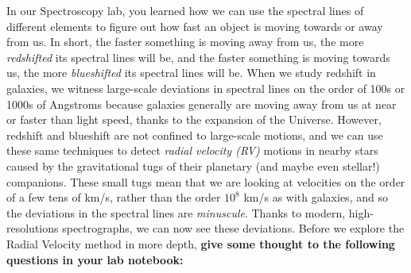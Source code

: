 \documentclass[11pt]{article}
\begin{document}
In our Spectroscopy lab, you learned how we can use the spectral lines of different elements to figure out how fast an object is moving towards or away from us.  In short, the faster something is moving away from us, the more \textit{redshifted} its spectral lines will be, and the faster something is moving towards us, the more \textit{blueshifted} its spectral lines will be.  When we study redshift in galaxies, we witness large-scale deviations in spectral lines on the order of 100s or 1000s of Angstroms because galaxies generally are moving away from us at near or faster than light speed, thanks to the expansion of the Universe.  However, redshift and blueshift are not confined to large-scale motions, and we can use these same techniques to detect \textit{radial velocity (RV)} motions in nearby stars caused by the gravitational tugs of their planetary (and maybe even stellar!) companions.  These small tugs mean that we are looking at velocities on the order of a few tens of km/s, rather than the order $10^8$ km/s as with galaxies, and so the deviations in the spectral lines are \textit{minuscule}.  Thanks to modern, high-resolutions spectrographs, we can now see these deviations.  Before we explore the Radial Velocity method in more depth, \textbf{give some thought to the following questions in your lab notebook:}
\end{document}
